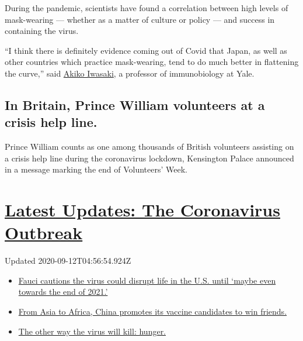 During the pandemic, scientists have found a correlation between high
levels of mask-wearing --- whether as a matter of culture or policy ---
and success in containing the virus.

``I think there is definitely evidence coming out of Covid that Japan,
as well as other countries which practice mask-wearing, tend to do much
better in flattening the curve,'' said
\href{https://medicine.yale.edu/profile/akiko_iwasaki/}{Akiko Iwasaki},
a professor of immunobiology at Yale.

\hypertarget{in-britain-prince-william-volunteers-at-a-crisis-help-line}{%
\subsection{In Britain, Prince William volunteers at a crisis help
line.}\label{in-britain-prince-william-volunteers-at-a-crisis-help-line}}

Prince William counts as one among thousands of British volunteers
assisting on a crisis help line during the coronavirus lockdown,
Kensington Palace announced in a message marking the end of Volunteers'
Week.

\hypertarget{latest-updates-the-coronavirus-outbreak}{%
\section{\texorpdfstring{\href{https://www.nytimes3xbfgragh.onion/2020/09/11/world/covid-19-coronavirus.html?action=click\&pgtype=Article\&state=default\&region=MAIN_CONTENT_1\&context=storylines_live_updates}{Latest
Updates: The Coronavirus
Outbreak}}{Latest Updates: The Coronavirus Outbreak}}\label{latest-updates-the-coronavirus-outbreak}}

Updated 2020-09-12T04:56:54.924Z

\begin{itemize}
\tightlist
\item
  \href{https://www.nytimes3xbfgragh.onion/2020/09/11/world/covid-19-coronavirus.html?action=click\&pgtype=Article\&state=default\&region=MAIN_CONTENT_1\&context=storylines_live_updates\#link-dfb8a16}{Fauci
  cautions the virus could disrupt life in the U.S. until `maybe even
  towards the end of 2021.'}
\item
  \href{https://www.nytimes3xbfgragh.onion/2020/09/11/world/covid-19-coronavirus.html?action=click\&pgtype=Article\&state=default\&region=MAIN_CONTENT_1\&context=storylines_live_updates\#link-7104d154}{From
  Asia to Africa, China promotes its vaccine candidates to win friends.}
\item
  \href{https://www.nytimes3xbfgragh.onion/2020/09/11/world/covid-19-coronavirus.html?action=click\&pgtype=Article\&state=default\&region=MAIN_CONTENT_1\&context=storylines_live_updates\#link-393ad215}{The
  other way the virus will kill: hunger.}
\end{itemize}

